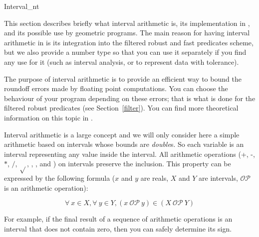 
\begin{ccClass} {Interval_nt}
\label{interval}

This section describes briefly what interval arithmetic is, its implementation
in {\cgal}, and its possible use by geometric programs.
The main reason for having interval arithmetic in {\cgal} is its integration
into the filtered robust and fast predicates scheme, but we also provide a
number type so that you can use it separately if you find any use for it
(such as interval analysis, or to represent data with tolerance).


The purpose of interval arithmetic is to provide an efficient way to bound
the roundoff errors made by floating point computations.
You can choose the behaviour of your program depending on these errors; that
is what is done for the filtered robust predicates (see Section~\ref{filter}).
You can find more theoretical information on this topic in
\cite{bbp-iayea-98}.

\ccDefinition
Interval arithmetic is a large concept and we will only consider here a 
simple arithmetic based on intervals whose bounds are {\it double}s.
So each variable is an interval representing any value inside the interval.
All arithmetic operations (+, -, $*$, $/$, $\sqrt{}$, ,
,  and ) on intervals preserve the inclusion.
This property can be expressed by the following formula ($x$ and $y$ are
reals, $X$ and $Y$ are intervals, $\mathcal{OP}$ is an arithmetic operation):

$$
\forall\ x \in X, \forall\ y \in Y, (x\ \mathcal{OP}\ y)
\in (X\ \mathcal{OP}\ Y)
$$

For example, if the final result of a sequence of arithmetic operations is
an interval that does not contain zero, then you can safely determine its sign.


\ccCreation


\end{ccClass}
